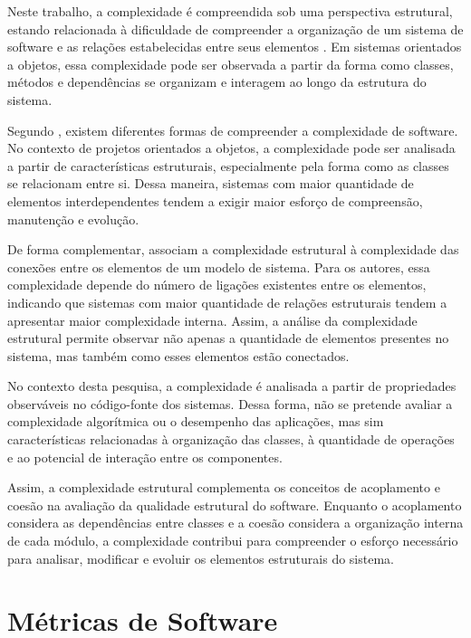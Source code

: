 Neste trabalho, a complexidade é compreendida sob uma perspectiva estrutural, estando relacionada à dificuldade de compreender a organização de 
um sistema de software e as relações estabelecidas entre seus elementos \cite{pressman2010,fenton2015}. Em sistemas orientados a objetos, essa 
complexidade pode ser observada a partir da forma como classes, métodos e dependências se organizam e interagem ao longo da estrutura do sistema.

Segundo , existem diferentes formas de compreender a complexidade de software. No contexto de projetos orientados a objetos, 
a complexidade pode ser analisada a partir de características estruturais, especialmente pela forma como as classes se relacionam entre si. Dessa maneira, 
sistemas com maior quantidade de elementos interdependentes tendem a exigir maior esforço de compreensão, manutenção e evolução.

De forma complementar,  associam a complexidade estrutural à complexidade das conexões entre os elementos de um modelo de sistema. 
Para os autores, essa complexidade depende do número de ligações existentes entre os elementos, indicando que sistemas com maior quantidade de relações 
estruturais tendem a apresentar maior complexidade interna. Assim, a análise da complexidade estrutural permite observar não apenas a quantidade de elementos 
presentes no sistema, mas também como esses elementos estão conectados.

No contexto desta pesquisa, a complexidade é analisada a partir de propriedades observáveis no código-fonte dos sistemas. Dessa forma, não se pretende
avaliar a complexidade algorítmica ou o desempenho das aplicações, mas sim características relacionadas à organização das classes, à quantidade de operações
e ao potencial de interação entre os componentes.

Assim, a complexidade estrutural complementa os conceitos de acoplamento e coesão na avaliação da qualidade estrutural do software. Enquanto o acoplamento 
considera as dependências entre classes e a coesão considera a organização interna de cada módulo, a complexidade contribui para compreender o esforço necessário 
para analisar, modificar e evoluir os elementos estruturais do sistema.

\section{Métricas de Software}
\label{sec:metricas-de-software}

